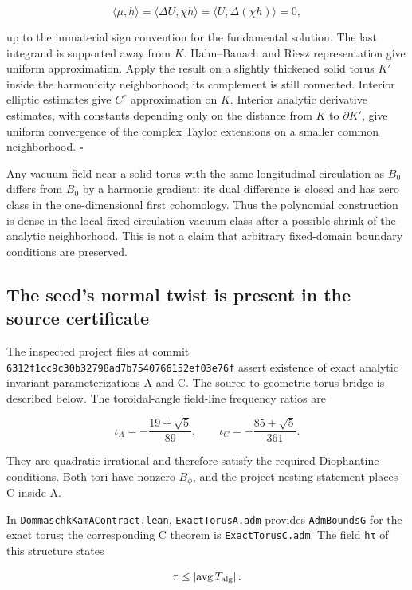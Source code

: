 \[
\langle\mu,h\rangle=\langle\Delta U,\chi h\rangle
=\langle U,\Delta(\chi h)\rangle=0,
\]

up to the immaterial sign convention for the fundamental solution. The last integrand is supported away from \(K\). Hahn--Banach and Riesz representation give uniform approximation. Apply the result on a slightly thickened solid torus \(K'\) inside the harmonicity neighborhood; its complement is still connected. Interior elliptic estimates give \(C^r\) approximation on \(K\). Interior analytic derivative estimates, with constants depending only on the distance from \(K\) to \(\partial K'\), give uniform convergence of the complex Taylor extensions on a smaller common neighborhood. \(\square\)

Any vacuum field near a solid torus with the same longitudinal circulation as \(B_0\) differs from \(B_0\) by a harmonic gradient: its dual difference is closed and has zero class in the one-dimensional first cohomology. Thus the polynomial construction is dense in the local fixed-circulation vacuum class after a possible shrink of the analytic neighborhood. This is not a claim that arbitrary fixed-domain boundary conditions are preserved.

\subsection{The seed's normal twist is present in the source certificate}\label{the-seeds-normal-twist-is-present-in-the-source-certificate}

The inspected project files at commit \texttt{6312f1cc9c30b32798ad7b7540766152ef03e76f} assert existence of exact analytic invariant parameterizations A and C. The source-to-geometric torus bridge is described below. The toroidal-angle field-line frequency ratios are

\[
\iota_A=-\frac{19+\sqrt5}{89},\qquad
\iota_C=-\frac{85+\sqrt5}{361}.
\]

They are quadratic irrational and therefore satisfy the required Diophantine conditions. Both tori have nonzero \(B_\phi\), and the project nesting statement places C inside A.

In \texttt{DommaschkKamAContract.lean}, \texttt{ExactTorusA.adm} provides \texttt{AdmBoundsG} for the exact torus; the corresponding C theorem is \texttt{ExactTorusC.adm}. The field \texttt{hτ} of this structure states

\[
\tau\leq\left|\operatorname{avg}T_{\rm alg}\right|.
\]

